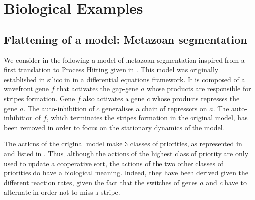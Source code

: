 
\section{Biological Examples}\label{sec:example}





\subsection{Flattening of a model: Metazoan segmentation}
\label{ssec:ex-metazoan}


We consider in the following a model of metazoan segmentation
inspired from a first translation to Process Hitting given in \cite{PMR10-TCSB}.
This model was originally established in silico in \cite{MSB:MSB4100192} in a differential equations framework.
It is composed of a wavefront gene $f$ that activates the gap-gene $a$ whose products are responsible for stripes formation.
Gene $f$ also activates a gene $c$ whose products represses the gene $a$.
The auto-inhibition of $c$ generalises a chain of repressors on $a$.
The auto-inhibition of $f$, which terminates the stripes formation in the original model,
has been removed in order to focus on the stationary dynamics of the model.

The actions of the original model make $3$ classes of priorities, as represented in 
and listed in .
Thus, although the actions of the highest class of priority are only used to update a cooperative sort,
the actions of the two other classes of priorities do have a biological meaning.
Indeed, they have been derived given the different reaction rates,
given the fact that the switches of genes $a$ and $c$ have to alternate in order not to miss a stripe.

